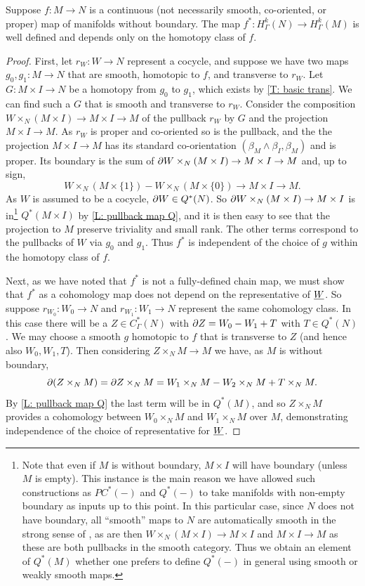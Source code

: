 \begin{proposition}\label{P: cohomology pullback}
	Suppose $f \colon M \to N$ is a continuous (not necessarily smooth, co-oriented, or proper) map of manifolds without boundary. The map $f^*:H^k_\Gamma(N) \to H^k_\Gamma(M)$ is well defined and depends only on the homotopy class of $f$.
\end{proposition}

\begin{proof}
	First, let $r_W \colon W \to N$ represent a cocycle, and suppose we have two maps $g_0, g_1 \colon M \to N$ that are smooth, homotopic to $f$, and transverse to $r_W$.
	Let $G \colon M \times I \to N$ be a homotopy from $g_0$ to $g_1$, which exists by \cref{T: basic trans}. We can find such a $G$ that is smooth and transverse to $r_W$. Consider the composition $W \times_N (M \times I) \to M \times I \to M$ of the pullback $r_W$ by $G$ and the projection $M \times I \to M$. As $r_W$ is proper and co-oriented so is the pullback, and the the projection $M \times I \to M$ has its standard co-orientation $(\beta_M \wedge \beta_I,\beta_M)$ and is proper. Its boundary is the sum of $\partial W \times_N (M \times I) \to M \times I \to M$ and, up to sign, $$W \times_N (M \times \{1\}) - W \times_N (M \times \{0\}) \to M \times I \to M.$$ As $W$ is assumed to be a cocycle, $\partial W \in Q^*(N)$. So $\partial W \times_N (M \times I) \to M \times I$ is in\footnote{Note that even if $M$ is without boundary, $M \times I$ will have boundary (unless $M$ is empty). This instance is the main reason we have allowed such constructions as $PC^*(-)$ and $Q^*(-)$ to take manifolds with non-empty boundary as inputs up to this point. In this particular case, since $N$ does not have boundary, all ``smooth'' maps to $N$ are automatically smooth in the strong sense of \cite{Joy12}, as are then $W \times_N (M \times I) \to M \times I$ and $M \times I \to M$ as these are both pullbacks in the smooth category. Thus we obtain an element of $Q^*(M)$ whether one prefers to define $Q^*(-)$ in general using smooth or weakly smooth maps.} $Q^*(M \times I)$ by \cref{L: pullback map Q}, and it is then easy to see that the projection to $M$ preserve triviality and small rank. The other terms correspond to the pullbacks of $W$ via $g_0$ and $g_1$. Thus $f^*$ is independent of the choice of $g$ within the homotopy class of $f$.

	Next, as we have noted that $f^*$ is not a fully-defined chain map, we must show that $f^*$ as a cohomology map does not depend on the representative of $\underline{W}$. So suppose $r_{W_0} \colon W_0 \to N$ and $r_{W_1} \colon W_1 \to N$ represent the same cohomology class. In this case there will be a $Z \in C^*_\Gamma(N)$ with $\partial Z = W_0-W_1+T$ with $T \in Q^*(N)$. We may choose a smooth $g$ homotopic to $f$ that is transverse to $Z$ (and hence also $W_0,W_1, T$). Then considering $Z \times_N M \to M$ we have, as $M$ is without boundary,
	$$\partial(Z \times_N M) = \partial Z \times_N M = W_1 \times_N M -W_2 \times_N M+T \times_N M.$$
	By \cref{L: pullback map Q} the last term will be in $Q^*(M)$, and so $Z \times_N M$ provides a cohomology between $W_0 \times_N M$ and $W_1 \times_N M$ over $M$, demonstrating independence of the choice of representative for $\underline{W}$.


\end{proof}
